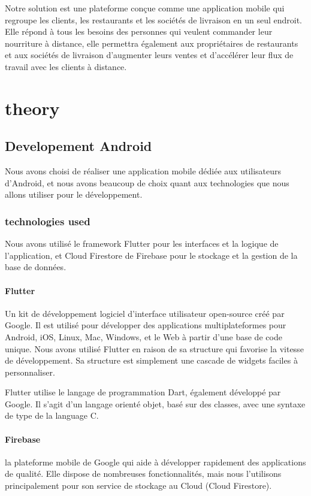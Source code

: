 \documentclass[a4paper, 10p]{report}
\begin{document}
Notre solution est une plateforme conçue comme une application mobile qui regroupe les clients, les restaurants et les sociétés de livraison en un seul endroit. Elle répond à tous les besoins des personnes qui veulent commander leur nourriture à distance, elle permettra également aux propriétaires de restaurants et aux sociétés de livraison d'augmenter leurs ventes et d'accélérer leur flux de travail avec les clients à distance.


\newpage
\chapter{theory}
	\section{Developement Android} Nous avons choisi de réaliser une application mobile dédiée aux utilisateurs d'Android, et nous avons beaucoup de choix quant aux technologies que nous allons utiliser pour le développement.
		\subsection{technologies used} Nous avons utilisé le framework Flutter pour les interfaces et la logique de l'application, et Cloud Firestore de Firebase pour le stockage et la gestion de la base de données.
		
			\subsubsection*{Flutter} Un kit de développement logiciel d'interface utilisateur open-source créé par Google. Il est utilisé pour développer des applications multiplateformes pour Android, iOS, Linux, Mac, Windows, et le Web à partir d'une base de code unique.
Nous avons utilisé Flutter en raison de sa structure qui favorise la vitesse de développement. Sa structure est simplement une cascade de widgets faciles à personnaliser.

Flutter utilise le langage de programmation Dart, également développé par Google. Il s'agit d'un langage orienté objet, basé sur des classes, avec une syntaxe de type de la language C.
			\subsubsection*{Firebase} la plateforme mobile de Google qui aide à développer rapidement des applications de qualité. Elle dispose de nombreuses fonctionnalités, mais nous l'utilisons principalement pour son service de stockage au Cloud (Cloud Firestore).
\end{document}
